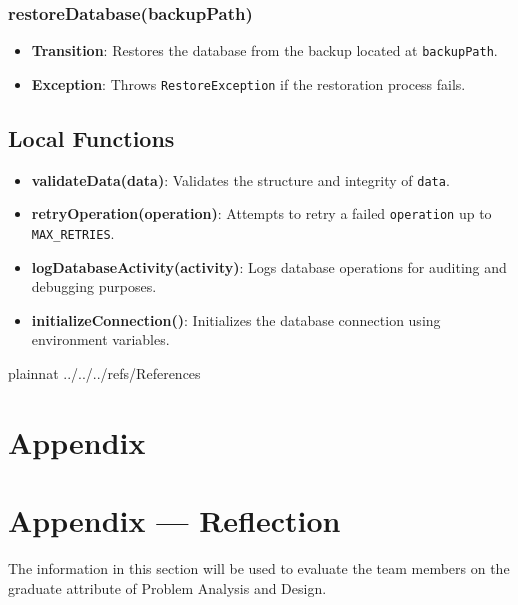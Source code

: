 \documentclass[12pt, titlepage]{article}
\begin{document}
\subsubsection{restoreDatabase(backupPath)}
\begin{itemize}
    \item \textbf{Transition}: Restores the database from the backup located at \texttt{backupPath}.
    \item \textbf{Exception}: Throws \texttt{RestoreException} if the restoration process fails.
\end{itemize}

\subsection{Local Functions}
\begin{itemize}
    \item \textbf{validateData(data)}: Validates the structure and integrity of \texttt{data}.
    \item \textbf{retryOperation(operation)}: Attempts to retry a failed \texttt{operation} up to \texttt{MAX\_RETRIES}.
    \item \textbf{logDatabaseActivity(activity)}: Logs database operations for auditing and debugging purposes.
    \item \textbf{initializeConnection()}: Initializes the database connection using environment variables.
\end{itemize}

 {plainnat}
 {../../../refs/References}

\newpage

\section{Appendix} \label{Appendix}


\newpage{}

\section*{Appendix --- Reflection}

The information in this section will be used to evaluate the team members on the
graduate attribute of Problem Analysis and Design.
\end{document}
